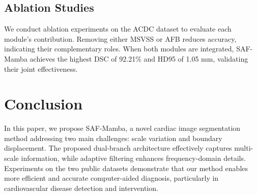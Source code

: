 \documentclass[conference]{IEEEtran}
\begin{document}
\subsection{Ablation Studies}
We conduct ablation experiments on the ACDC dataset to evaluate each module’s contribution. Removing either MSVSS or AFB reduces accuracy, indicating their complementary roles. When both modules are integrated, SAF-Mamba achieves the highest DSC of 92.21\% and HD95 of 1.05 mm, validating their joint effectiveness.





\section{Conclusion}
In this paper, we propose SAF-Mamba, a novel cardiac image segmentation method addressing two main challenges: scale variation and boundary displacement. The proposed dual-branch architecture effectively captures multi-scale information, while adaptive filtering enhances frequency-domain details. Experiments on the two public datasets demonstrate that our method enables  more efficient and accurate computer-aided diagnosis, particularly in cardiovascular disease detection and intervention.







\end{document}
